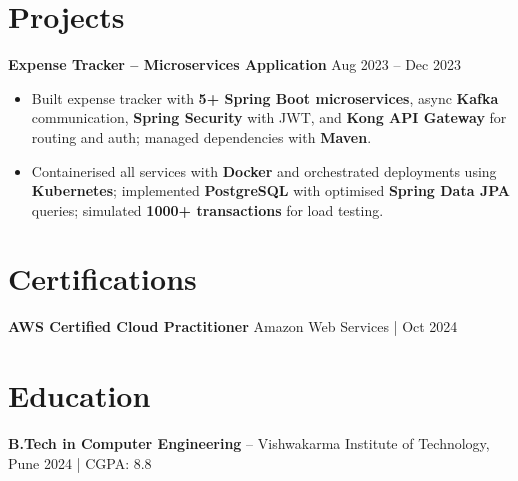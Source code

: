 \documentclass[a4paper,10pt]{article}
\begin{document}
\section*{Projects}

\textbf{Expense Tracker -- Microservices Application} \hfill Aug 2023 -- Dec 2023
\begin{itemize}[leftmargin=*]
    \item Built expense tracker with \textbf{5+ Spring Boot microservices}, async \textbf{Kafka} communication, \textbf{Spring Security} with JWT, and \textbf{Kong API Gateway} for routing and auth; managed dependencies with \textbf{Maven}.
    \item Containerised all services with \textbf{Docker} and orchestrated deployments using \textbf{Kubernetes}; implemented \textbf{PostgreSQL} with optimised \textbf{Spring Data JPA} queries; simulated \textbf{1000+ transactions} for load testing.
\end{itemize}

\section*{Certifications}
\textbf{AWS Certified Cloud Practitioner} \hfill Amazon Web Services \;|\; Oct 2024

\section*{Education}
\textbf{B.Tech in Computer Engineering} -- Vishwakarma Institute of Technology, Pune \hfill 2024 \;|\; CGPA: 8.8
\end{document}

